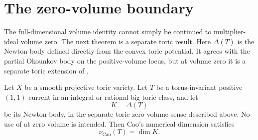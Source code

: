 \section{The zero-volume boundary}

The full-dimensional volume identity cannot simply be continued to
multiplier-ideal volume zero.
The next theorem is a separate toric result.
Here \(\Delta(T)\) is the Newton body defined directly from the convex
toric potential.  It agrees with the partial Okounkov body on the
positive-volume locus, but at volume zero it is a separate toric extension
of .

\begin{theorem}\label{thm:ok-toric-zero-mass}
Let \(X\) be a smooth projective toric variety.
Let \(T\) be a torus-invariant positive \((1,1)\)-current in an integral or
rational big toric class, and let
\[
                             K=\Delta(T)
\]
be its Newton body, in the separate toric zero-volume sense described
above.  No use of  at zero volume is
intended.
Then Cao's numerical dimension satisfies
\[
                         \nu_{\mathrm{Cao}}(T)=\dim K.
\tag{55.50}\label{eq:ok-toric-numdim}
\]
\end{theorem}

